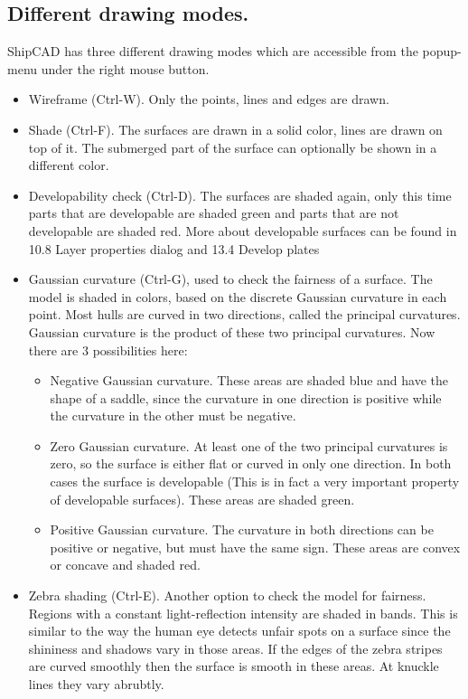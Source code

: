 \documentclass[12pt]{article}
\begin{document}
\subsection{Different drawing modes.}
ShipCAD has three different drawing modes which are accessible from the popup-menu under the
right mouse button.
\begin{itemize}
  \item Wireframe (Ctrl-W). Only the points, lines and edges are drawn.
  \item  Shade (Ctrl-F). The surfaces are drawn in a solid color, lines are drawn on top of it. The
submerged part of the surface can optionally be shown in a different color.
  \item Developability check (Ctrl-D). The surfaces are shaded again, only this time parts that are
developable are shaded green and parts that are not developable are shaded red. More
about developable surfaces can be found in 10.8 Layer properties dialog and 13.4 Develop
plates
  \item Gaussian curvature (Ctrl-G), used to check the
fairness of a surface. The model is shaded in
colors, based on the discrete Gaussian
curvature in each point. Most hulls are curved in
two directions, called the principal curvatures.
Gaussian curvature is the product of these two
principal curvatures. Now there are 3
possibilities here:

\begin{itemize}
  \item Negative Gaussian curvature. These
areas are shaded blue and have the
shape of a saddle, since the curvature in
one direction is positive while the
curvature in the other must be negative.
  \item Zero Gaussian curvature. At least one of the two principal curvatures is zero, so the
surface is either flat or curved in only one direction. In both cases the surface is
developable (This is in fact a very important property of developable surfaces). These
areas are shaded green.
  \item Positive Gaussian curvature. The curvature in both directions can be positive or
negative, but must have the same sign. These areas are convex or concave and
shaded red.
\end{itemize}

  \item Zebra shading (Ctrl-E). Another option to check the model for fairness. Regions with a
constant light-reflection intensity are shaded in
bands. This is similar to the way the human eye
detects unfair spots on a surface since the
shininess and shadows vary in those areas. If the
edges of the zebra stripes are curved smoothly
then the surface is smooth in these areas. At
knuckle lines they vary abrubtly.
\end{itemize}
\end{document}
